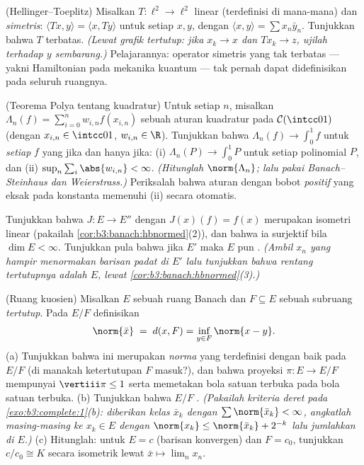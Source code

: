 \begin{exercise}[$\star\star\star$]\label{exo:b3:banach:8}
(Hellinger--Toeplitz) Misalkan $T \colon \ell^2 \to \ell^2$ linear
(terdefinisi di mana-mana) dan \emph{simetris}: $\langle Tx,
y\rangle = \langle x, Ty\rangle$ untuk setiap $x, y$, dengan $\langle
x, y \rangle = \sum x_n\bar y_n$. Tunjukkan bahwa $T$ terbatas.
\emph{(Lewat grafik tertutup: jika $x_k \to x$ dan $Tx_k \to z$, ujilah
terhadap $y$ sembarang.)} Pelajarannya: operator simetris yang tak terbatas
--- yakni Hamiltonian pada mekanika kuantum --- tak pernah dapat
didefinisikan pada seluruh ruangnya.
\end{exercise}

\begin{exercise}[$\star\star\star$]\label{exo:b3:banach:9}
(Teorema Polya tentang kuadratur) Untuk setiap $n$, misalkan $\Lambda_n(f)
= \sum_{i=0}^{n} w_{i,n}f(x_{i,n})$ sebuah aturan kuadratur pada
$\mathcal C(\intcc01)$ (dengan $x_{i,n} \in \intcc01$, $w_{i,n} \in
\R$). Tunjukkan bahwa $\Lambda_n(f) \to \int_0^1f$ untuk \emph{setiap}
$f$ yang  jika dan hanya jika: (i) $\Lambda_n(P) \to \int_0^1P$
untuk setiap polinomial $P$, dan (ii) $\sup_n\sum_i\abs{w_{i,n}} <
\infty$. \emph{(Hitunglah $\norm{\Lambda_n}$; lalu pakai
Banach--Steinhaus dan Weierstrass.)} Periksalah bahwa aturan dengan
bobot \emph{positif} yang eksak pada konstanta memenuhi (ii)
secara otomatis.
\end{exercise}

\begin{exercise}[$\star\star$]\label{exo:b3:banach:10}
Tunjukkan bahwa $J \colon E \to E''$ dengan $J(x)(f) = f(x)$ merupakan
isometri linear (pakailah \cref{cor:b3:banach:hbnormed}(2)), dan bahwa ia
surjektif bila $\dim E < \infty$. Tunjukkan pula bahwa jika $E'$
 maka $E$ pun . \emph{(Ambil $x_n$ yang hampir menormakan
barisan padat di $E'$ lalu tunjukkan bahwa rentang tertutupnya adalah $E$, lewat
\cref{cor:b3:banach:hbnormed}(3).)}
\end{exercise}

\begin{exercise}[$\star\star$]\label{exo:b3:banach:11}
(Ruang kuosien) Misalkan $E$ sebuah ruang Banach dan $F \subseteq
E$ sebuah subruang \emph{tertutup}. Pada $E/F$ definisikan
\[
\norm{\bar x} \;=\; d(x, F) = \inf_{y\in F}\norm{x - y} .
\]
(a) Tunjukkan bahwa ini merupakan \emph{norma} yang terdefinisi dengan baik pada $E/F$ (di
manakah ketertutupan $F$ masuk?), dan bahwa proyeksi $\pi
\colon E \to E/F$ mempunyai $\vertiii\pi \leq 1$ serta memetakan bola
satuan terbuka pada bola satuan terbuka.
(b) Tunjukkan bahwa $E/F$ . \emph{(Pakailah kriteria deret
pada \cref{exo:b3:complete:1}(b): diberikan kelas
$\bar x_k$ dengan $\sum\norm{\bar x_k} < \infty$, angkatlah masing-masing ke
$x_k \in E$ dengan $\norm{x_k} \leq \norm{\bar x_k} + 2^{-k}$
lalu jumlahkan di $E$.)}
(c) Hitunglah: untuk $E = c$ (barisan konvergen) dan $F =
c_0$, tunjukkan $c/c_0 \cong K$ secara isometrik lewat $\bar x \mapsto
\lim_nx_n$.
\end{exercise}

